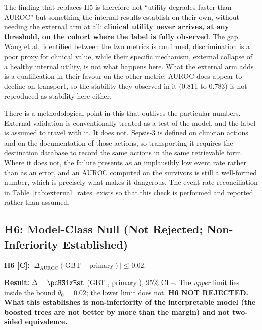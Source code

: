 The finding that replaces H5 is therefore not ``utility degrades faster than
AUROC'' but something the internal results establish on their own, without
needing the external arm at all: \textbf{clinical utility never arrives, at any
threshold, on the cohort where the label is fully observed}. The gap Wang et
al.\ identified between the two metrics is confirmed, discrimination is a
poor proxy for clinical value, while their specific mechanism, external
collapse of a healthy internal utility, is not what happens here. What the
external arm adds is a qualification in their favour on the other metric: AUROC
does appear to decline on transport, so the stability they observed in it
(0.811 to 0.783) is not reproduced as stability here either.

There is a methodological point in this that outlives the particular numbers.
External validation is conventionally treated as a test of the model, and the
label is assumed to travel with it. It does not. Sepsis-3 is defined on
clinician actions and on the documentation of those actions, so transporting it
requires the destination database to record the same actions in the same
retrievable form. Where it does not, the failure presents as an implausibly low
event rate rather than as an error, and an AUROC computed on the survivors is
still a well-formed number, which is precisely what makes it dangerous. The
event-rate reconciliation in Table~\ref{tab:external_rates} exists so that this
check is performed and reported rather than assumed.

\subsection{H6: Model-Class Null (Not Rejected; Non-Inferiority Established)}
\label{sec:h6}

\begin{mdframed}[backgroundcolor=ATUSand!30, linecolor=ATUGreen]
    \textbf{H6 [C]:} $|\Delta_\text{AUROC}(\text{GBT} - \text{primary})| \leq 0.02$.

    \textbf{Result:} $\Delta = \pcHSixEst$ (GBT \pcAurocGbtB, primary
    \pcAurocPrimaryB), 95\% CI \pcHSixCiLo--\pcHSixCiHi. The \emph{upper} limit
    lies inside the bound $\theta_0 = 0.02$; the lower limit does not.
    \textbf{H6 NOT REJECTED. What this establishes is non-inferiority of the
    interpretable model (the boosted trees are not better by more than the
    margin) and not two-sided equivalence.}
\end{mdframed}

